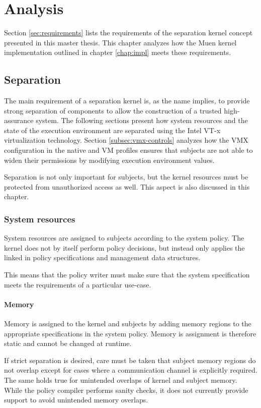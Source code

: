 \chapter{Analysis}
Section \ref{sec:requirements} lists the requirements of the separation kernel
concept presented in this master thesis. This chapter analyzes how the
Muen kernel implementation outlined in chapter \ref{chap:impl} meets these
requirements.

\section{Separation}
The main requirement of a separation kernel is, as the name implies, to provide
strong separation of components to allow the construction of a trusted
high-assurance system. The following sections present how system resources and
the state of the execution environment are separated using the Intel VT-x
virtualization technology. Section \ref{subsec:vmx-controls} analyzes how the
VMX configuration in the native and VM profiles ensures that subjects are not
able to widen their permissions by modifying execution environment values.

Separation is not only important for subjects, but the kernel resources must be
protected from unauthorized access as well. This aspect is also discussed in
this chapter.

\subsection{System resources}
System resources are assigned to subjects according to the system policy. The
kernel does not by itself perform policy decisions, but instead only applies
the linked in policy specifications and management data structures.

This means that the policy writer must make sure that the system specification
meets the requirements of a particular use-case.

\subsubsection{Memory}
Memory is assigned to the kernel and subjects by adding memory regions to the
appropriate specifications in the system policy. Memory is assignment is
therefore static and cannot be changed at runtime.

If strict separation is desired, care must be taken that subject memory regions
do not overlap except for cases where a communication channel is explicitly
required. The same holds true for unintended overlaps of kernel and subject
memory.  While the policy compiler performs sanity checks, it does not currently
provide support to avoid unintended memory overlaps.

